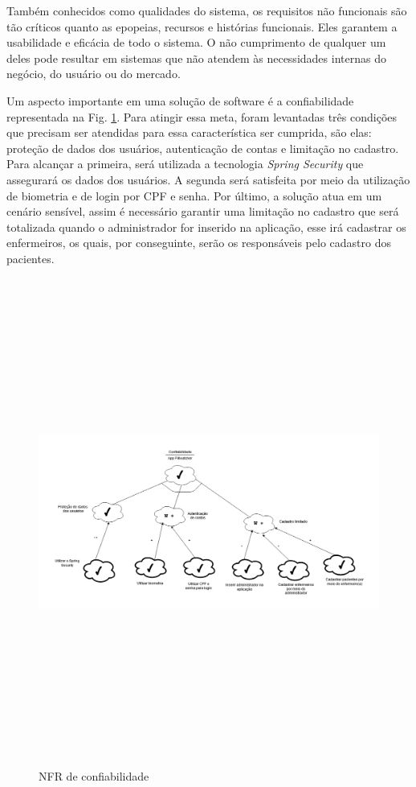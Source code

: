 Também conhecidos como qualidades do sistema, os requisitos não funcionais são tão críticos quanto as epopeias, recursos e histórias funcionais. Eles garantem a usabilidade e eficácia de todo o sistema. O não cumprimento de qualquer um deles pode resultar em sistemas que não atendem às necessidades internas do negócio, do usuário ou do mercado.


Um aspecto importante em uma solução de software é a confiabilidade representada na Fig. \ref{fig:nfr-confiabilidade}. Para atingir essa meta, foram levantadas três condições que precisam ser atendidas para essa característica ser cumprida, são elas: proteção de dados dos usuários, autenticação de contas e limitação no cadastro. Para alcançar a primeira, será utilizada a tecnologia \textit{Spring Security} que assegurará os dados dos usuários. A segunda será satisfeita por meio da utilização de biometria e de login por CPF e senha. Por último, a solução atua em um cenário sensível, assim é necessário garantir uma limitação no cadastro que será totalizada quando o administrador for inserido na aplicação, esse irá cadastrar os enfermeiros, os quais, por conseguinte, serão os responsáveis pelo cadastro dos pacientes. 

\begin{figure}[H]
    \centering
    \includegraphics[width=16cm, height=16cm, keepaspectratio]{figuras/software/NFR/NFR_confiabilidade.png}
    \caption{NFR de confiabilidade}
    \label{fig:nfr-confiabilidade}
\end{figure}

